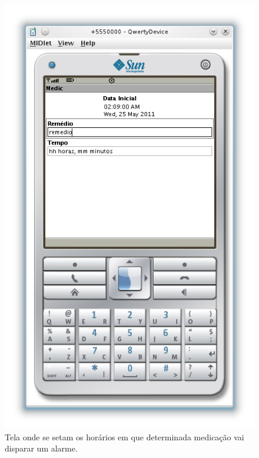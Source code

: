 \documentclass[12pt,a4paper]{article}
\begin{document}
	\begin{figure}[htb]
		\begin{center}
			\leavevmode
			\includegraphics[scale=1]{medalert-medic-temporizado.png}
		\end{center}
		\caption{Tela onde se setam os horários em que determinada medicação vai disparar um alarme.}
		\label{fig:medalert-medic-temporizado}
	\end{figure}
\end{document}
